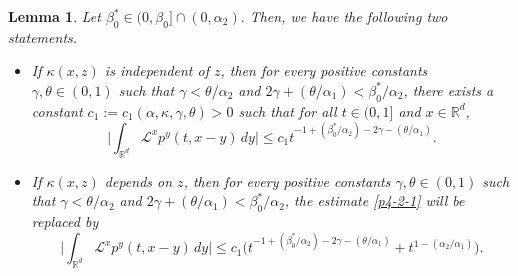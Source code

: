 \documentclass[a4paper,11pt]{amsart}
\renewcommand{\le}{\leqslant}
\newcommand{\R}{\mathds R}
\newcommand{\B}{\beta}
\newcommand{\T}{\theta}
\newcommand{\K}{\kappa}
\newcommand{\A}{\alpha}
\newcommand{\G}{\gamma}
\def\LL{{\mathcal L}}
\newtheorem{lemma}[theorem]{Lemma}
\theoremstyle{definition}
\begin{document}
\begin{lemma}\label{p4-2} Let $\B_0^*\in(0,\B_0]\cap(0,{\alpha_2}).$ Then, we have the following two statements.
\begin{itemize}
\item[(1)] If $\K(x,z)$ is independent of $z$, then for every positive
constants $\gamma,\theta \in (0,1)$ such that $\gamma<{\theta}/{\A_2}$ and
$2\gamma+({\theta}/{\A_1})<\B_0^*/\A_2$, there exists a constant $c_1:=c_1(\A,\K,\G,\T)>0$ such that for all $t \in (0,1]$ and $x\in \R^d$,
\begin{equation}\label{p4-2-1}
\Big|\int_{\R^d} \LL^xp^y(t,x-y)\,dy\Big|\le c_1t^{-1+(\B_0^*/\A_2)-2\G-({\theta}/{\A_1})}.
\end{equation}

\item[(2)] If $\K(x,z)$ depends on $z$, then for every positive
constants $\gamma,\theta \in (0,1)$ such that $\gamma<{\theta}/{\A_2}$ and
$2\gamma+({\theta}/{\A_1})<\B_0^*/\A_2$, the estimate
\eqref{p4-2-1} will be replaced by
\begin{equation}\label{p4-2-1a}
\Big|\int_{\R^d} \LL^xp^y(t,x-y)\,dy\Big|\le c_1\big(
t^{-1+(\B_0^*/\A_2)-2\G-({\theta}/{\A_1})}+t^{1-{(\A_2/\A_1)}}\big).
\end{equation}
\end{itemize}
\end{lemma}
\end{document}

